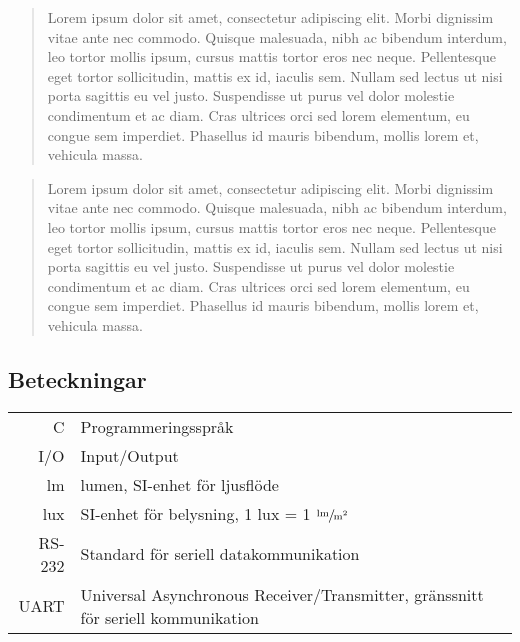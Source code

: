 \renewcommand{\abstractname}{Sammandrag}
\begin{abstract}
    Lorem ipsum dolor sit amet, consectetur adipiscing elit. Morbi dignissim vitae ante nec commodo. Quisque malesuada, nibh ac bibendum interdum, leo tortor mollis ipsum, cursus mattis tortor eros nec neque. Pellentesque eget tortor sollicitudin, mattis ex id, iaculis sem. Nullam sed lectus ut nisi porta sagittis eu vel justo. Suspendisse ut purus vel dolor molestie condimentum et ac diam. Cras ultrices orci sed lorem elementum, eu congue sem imperdiet. Phasellus id mauris bibendum, mollis lorem et, vehicula massa.
\end{abstract}

\renewcommand{\abstractname}{Abstract}
\begin{abstract}
    Lorem ipsum dolor sit amet, consectetur adipiscing elit. Morbi dignissim vitae ante nec commodo. Quisque malesuada, nibh ac bibendum interdum, leo tortor mollis ipsum, cursus mattis tortor eros nec neque. Pellentesque eget tortor sollicitudin, mattis ex id, iaculis sem. Nullam sed lectus ut nisi porta sagittis eu vel justo. Suspendisse ut purus vel dolor molestie condimentum et ac diam. Cras ultrices orci sed lorem elementum, eu congue sem imperdiet. Phasellus id mauris bibendum, mollis lorem et, vehicula massa. 
\end{abstract}

\newpage

\subsection*{Beteckningar} %
\label{sub:beteckningar}
    \begin{tabularx}{\textwidth}{@{}rX}
        C & Programmeringsspråk \\
        I/O & Input/Output \\
        lm & lumen, SI-enhet för ljusflöde \\
        lux & SI-enhet för belysning, 1 lux = 1 $\sfrac{\text{lm}}{\text{m}^2}$ \\
        RS-232 & Standard för seriell datakommunikation \\
        UART & Universal Asynchronous Receiver/Transmitter, gränssnitt för seriell kommunikation
        
    \end{tabularx}
